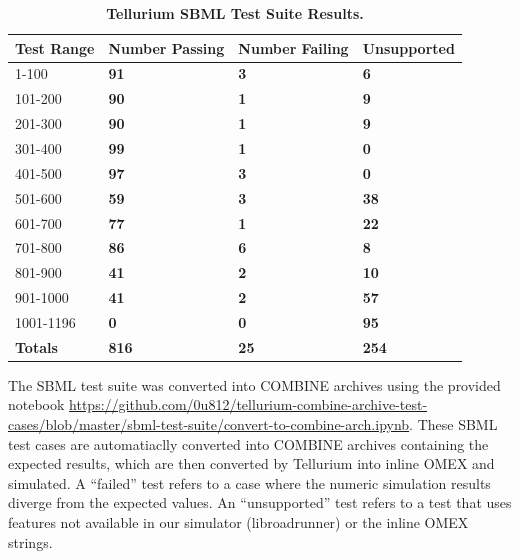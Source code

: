 \documentclass[10pt,letterpaper]{article}
\newlength\savedwidth
\newcommand\thickhline{\noalign{\global\savedwidth\arrayrulewidth\global\arrayrulewidth 2pt}%
\hline
\noalign{\global\arrayrulewidth\savedwidth}}
\begin{document}
\begin{table}[t]
\centering
\caption{
{\bf Tellurium SBML Test Suite Results.} }
\begin{tabular}{l|l|l|l|}
\hline
{\bf Test Range} & {\bf Number Passing} & {\bf Number Failing} & {\bf Unsupported}\\ \hline %
  1-100  & \textbf{91} & \textbf{3} & \textbf{ 6} \\ \hline
101-200  & \textbf{90} & \textbf{1} & \textbf{ 9} \\ \hline
201-300  & \textbf{90} & \textbf{1} & \textbf{ 9} \\ \hline
301-400  & \textbf{99} & \textbf{1} & \textbf{ 0} \\ \hline
401-500  & \textbf{97} & \textbf{3} & \textbf{ 0} \\ \hline
501-600  & \textbf{59} & \textbf{3} & \textbf{38} \\ \hline
601-700  & \textbf{77} & \textbf{1} & \textbf{22} \\ \hline
701-800  & \textbf{86} & \textbf{6} & \textbf{ 8} \\ \hline
801-900  & \textbf{41} & \textbf{2} & \textbf{10} \\ \hline
901-1000 & \textbf{41} & \textbf{2} & \textbf{57} \\ \hline
1001-1196& \textbf{ 0} & \textbf{0} & \textbf{95} \\ \hline
\textbf{Totals}& \textbf{816} & \textbf{25} & \textbf{254} \\ \hline
\end{tabular}
\begin{flushleft} The SBML test suite was converted into COMBINE archives using the provided notebook \href{https://github.com/0u812/tellurium-combine-archive-test-cases/blob/master/sbml-test-suite/convert-to-combine-arch.ipynb}{https://github.com/0u812/tellurium-combine-archive-test-cases/blob/master/sbml-test-suite/convert-to-combine-arch.ipynb}. These SBML test cases are automatiaclly converted into COMBINE archives containing the expected results, which are then converted by Tellurium into inline OMEX and simulated. A ``failed'' test refers to a case where the numeric simulation results diverge from the expected values. An ``unsupported'' test refers to a test that uses features not available in our simulator (libroadrunner) or the inline OMEX strings.
\end{flushleft}
\label{sbmlbenchmark}
\end{table}
\end{document}
